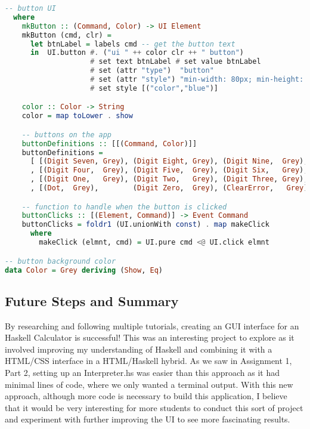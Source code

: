 \documentclass{article}
\begin{document}
\begin{lstlisting}[language=Haskell]
-- button UI
  where
    mkButton :: (Command, Color) -> UI Element
    mkButton (cmd, clr) =
      let btnLabel = labels cmd -- get the button text
      in  UI.button #. ("ui " ++ color clr ++ " button")
                    # set text btnLabel # set value btnLabel
                    # set (attr "type")  "button"
                    # set (attr "style") "min-width: 80px; min-height: 60px; font-size: 24px"
                    # set style [("color","blue")]

    color :: Color -> String
    color = map toLower . show

    -- buttons on the app
    buttonDefinitions :: [[(Command, Color)]]
    buttonDefinitions =
      [ [(Digit Seven, Grey), (Digit Eight, Grey), (Digit Nine,  Grey), (Operation Add, Grey), (Operation Sub, Grey)]
      , [(Digit Four,  Grey), (Digit Five,  Grey), (Digit Six,   Grey), (Operation Mul, Grey), (Operation Div, Grey)]
      , [(Digit One,   Grey), (Digit Two,   Grey), (Digit Three, Grey), (Operation Exp, Grey), (Operation Mod, Grey)]
      , [(Dot,  Grey),        (Digit Zero,  Grey), (ClearError,   Grey), (Clear,        Grey), (Equal, Grey)] ]

    -- function to handle when the button is clicked
    buttonClicks :: [(Element, Command)] -> Event Command
    buttonClicks = foldr1 (UI.unionWith const) . map makeClick
      where
        makeClick (elmnt, cmd) = UI.pure cmd <@ UI.click elmnt

-- button background color
data Color = Grey deriving (Show, Eq)  
\end{lstlisting}  

\subsection{Future Steps and Summary}
By researching and following multiple tutorials, creating an GUI interface for an Haskell Calculator is successful! This was an interesting project to explore as it involved improving my understanding of Haskell and combining it with a HTML/CSS interface in a HTML/Haskell hybrid. As we saw in Assignment 1, Part 2, setting up an Interpreter.hs was easier than this approach as it had minimal lines of code, where we only wanted a terminal output. With this new approach, although more code is necessary to build this application, I believe that it would be very interesting for more students to conduct this sort of project and experiment with further improving the UI to see more fascinating results. 
  
\end{document}
